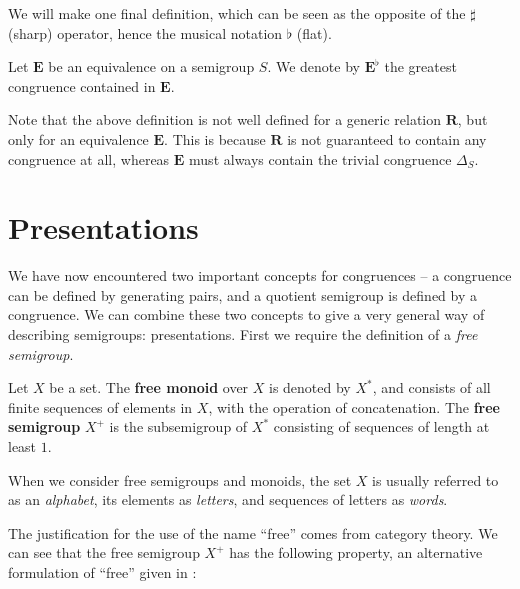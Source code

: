 We will make one final definition, which can be seen as the opposite of the
$\sharp$ (sharp) operator, hence the musical notation $\flat$ (flat).

\begin{definition}
  \label{def:e-flat}
  Let $\mathbf{E}$ be an equivalence on a semigroup $S$.  We denote by
  $\mathbf{E}^\flat$ the greatest congruence contained in $\mathbf{E}$.
\end{definition}

Note that the above definition is not well defined for a generic relation
$\mathbf{R}$, but only for an equivalence $\mathbf{E}$.  This is because
$\mathbf{R}$ is not guaranteed to contain any congruence at all, whereas
$\mathbf{E}$ must always contain the trivial congruence $\Delta_S$.

\section{Presentations}
\label{sec:intro-presentations}

We have now encountered two important concepts for congruences -- a congruence
can be defined by generating pairs, and a quotient semigroup is defined by a
congruence.  We can combine these two concepts to give a very general way of
describing semigroups: presentations.  First we require the definition of a
\textit{free semigroup}.

\begin{definition}
  \label{def:free}
  Let $X$ be a set.  The \textbf{free monoid} over $X$ is denoted by $X^*$, and
  consists of all finite sequences of elements in $X$, with the operation of
  concatenation.  The \textbf{free semigroup} $X^+$ is the subsemigroup of $X^*$
  consisting of sequences of length at least $1$.
\end{definition}

When we consider free semigroups and monoids, the set $X$ is usually referred to
as an \textit{alphabet}, its elements as \textit{letters}, and sequences of
letters as \textit{words}.

The justification for the use of the name ``free'' comes from category theory.
We can see that the free semigroup $X^+$ has the following property, an
alternative formulation of ``free'' given in \cite[\S 1.6]{howie}:

